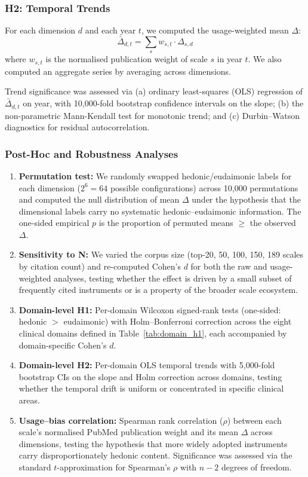 \documentclass[12pt,a4paper]{article}
\newcommand{\Ddelta}{$\Delta$}
\begin{document}
\subsubsection{H2: Temporal Trends}

For each dimension $d$ and each year $t$, we computed the usage-weighted mean \Ddelta:
\begin{equation}
\bar{\Delta}_{d,t} = \sum_{s} w_{s,t} \cdot \Delta_{s,d}
\label{eq:yearly_delta}
\end{equation}
where $w_{s,t}$ is the normalised publication weight of scale $s$ in year $t$.
We also computed an aggregate series by averaging across dimensions.

Trend significance was assessed via (a) ordinary least-squares (OLS) regression of $\bar{\Delta}_{d,t}$ on year, with 10{,}000-fold bootstrap confidence intervals on the slope; (b) the non-parametric Mann-Kendall test for monotonic trend; and (c) Durbin--Watson diagnostics for residual autocorrelation.

\subsubsection{Post-Hoc and Robustness Analyses}

\begin{enumerate}
    \item \textbf{Permutation test:} We randomly swapped hedonic/eudaimonic labels for each dimension ($2^6 = 64$ possible configurations) across 10{,}000 permutations and computed the null distribution of mean \Ddelta{} under the hypothesis that the dimensional labels carry no systematic hedonic--eudaimonic information. The one-sided empirical $p$ is the proportion of permuted means $\geq$ the observed $\Delta$.
    \item \textbf{Sensitivity to N:} We varied the corpus size (top-20, 50, 100, 150, 189 scales by citation count) and re-computed Cohen's $d$ for both the raw and usage-weighted analyses, testing whether the effect is driven by a small subset of frequently cited instruments or is a property of the broader scale ecosystem.
    \item \textbf{Domain-level H1:} Per-domain Wilcoxon signed-rank tests (one-sided: hedonic $>$ eudaimonic) with Holm--Bonferroni correction across the eight clinical domains defined in Table~\ref{tab:domain_h1}, each accompanied by domain-specific Cohen's $d$.
    \item \textbf{Domain-level H2:} Per-domain OLS temporal trends with 5{,}000-fold bootstrap CIs on the slope and Holm correction across domains, testing whether the temporal drift is uniform or concentrated in specific clinical areas.
    \item \textbf{Usage--bias correlation:} Spearman rank correlation ($\rho$) between each scale's normalised PubMed publication weight and its mean \Ddelta{} across dimensions, testing the hypothesis that more widely adopted instruments carry disproportionately hedonic content. Significance was assessed via the standard $t$-approximation for Spearman's $\rho$ with $n - 2$ degrees of freedom.
\end{enumerate}
\end{document}
